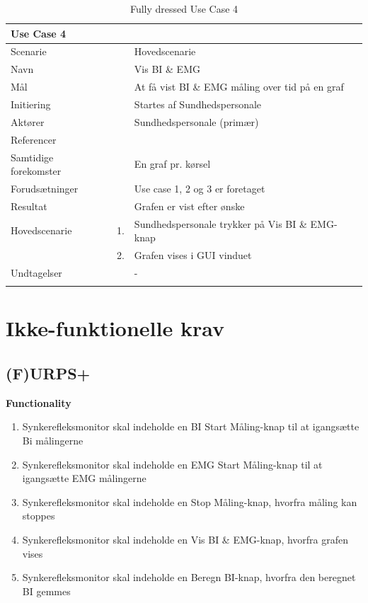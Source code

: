 \documentclass[main.tex]{subfiles}
\begin{document}
\begin{longtabu} to  %
	{\large \textbf{Use Case 4}} && \\
	\toprule
	Scenarie 				&&	Hovedscenarie\\
	Navn 					&& 	Vis BI \& EMG\\
	Mål 					&& 	At få vist BI \& EMG måling over tid på en graf\\
	Initiering 				&& 	Startes af Sundhedspersonale\\
	Aktører 				&& 	Sundhedspersonale (primær)\\
	Referencer 				&& 	\\
	Samtidige forekomster  	&& 	En graf pr. kørsel \\
	Forudsætninger 			&&	Use case 1, 2 og 3 er foretaget\\ 
	Resultat 				&& 	Grafen er vist efter ønske\\ \midrule
	Hovedscenarie 			&    1. 	&	Sundhedspersonale trykker på Vis BI \& EMG-knap\\				 	
							&    2. 	& 	Grafen vises i GUI vinduet\\
	Undtagelser 			&			& 	-  \\ \bottomrule
	
	\caption{Fully dressed Use Case 4}
	\label{UC4}
\end{longtabu}


\section{Ikke-funktionelle krav}
\subsection{(F)URPS+}

\textbf{Functionality}
\begin{enumerate}
\item Synkerefleksmonitor skal indeholde en BI Start Måling-knap til at igangsætte Bi målingerne
\item Synkerefleksmonitor skal indeholde en EMG Start Måling-knap til at igangsætte EMG målingerne 
\item Synkerefleksmonitor skal indeholde en Stop Måling-knap, hvorfra måling kan stoppes
\item Synkerefleksmonitor skal indeholde en Vis BI \& EMG-knap, hvorfra grafen vises
\item Synkerefleksmonitor skal indeholde en Beregn BI-knap, hvorfra den beregnet BI gemmes
\end{enumerate}
\end{document}
